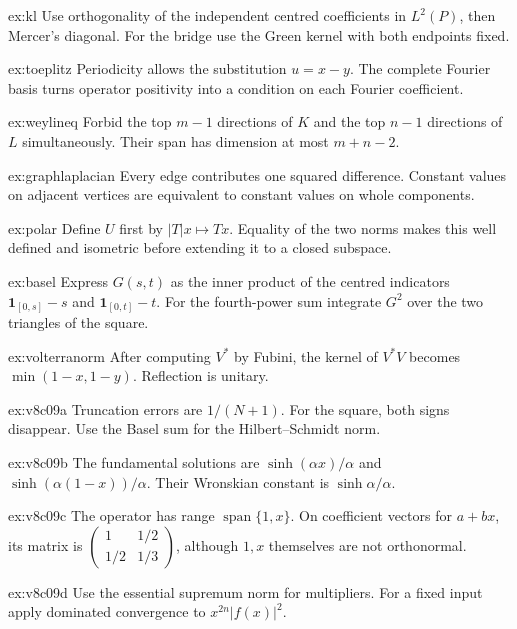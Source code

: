 \begin{hint}{ex:kl}
Use orthogonality of the independent centred coefficients in $L^2(P)$, then Mercer's diagonal. For the bridge use the Green kernel with both endpoints fixed.
\end{hint}
\begin{hint}{ex:toeplitz}
Periodicity allows the substitution $u=x-y$. The complete Fourier basis turns operator positivity into a condition on each Fourier coefficient.
\end{hint}
\begin{hint}{ex:weylineq}
Forbid the top $m-1$ directions of $K$ and the top $n-1$ directions of $L$ simultaneously. Their span has dimension at most $m+n-2$.
\end{hint}
\begin{hint}{ex:graphlaplacian}
Every edge contributes one squared difference. Constant values on adjacent vertices are equivalent to constant values on whole components.
\end{hint}
\begin{hint}{ex:polar}
Define $U$ first by $|T|x\mapsto Tx$. Equality of the two norms makes this well defined and isometric before extending it to a closed subspace.
\end{hint}
\begin{hint}{ex:basel}
Express $G(s,t)$ as the inner product of the centred indicators $\mathbf1_{[0,s]}-s$ and $\mathbf1_{[0,t]}-t$. For the fourth-power sum integrate $G^2$ over the two triangles of the square.
\end{hint}
\begin{hint}{ex:volterranorm}
After computing $V^*$ by Fubini, the kernel of $V^*V$ becomes $\min(1-x,1-y)$. Reflection is unitary.
\end{hint}
\begin{hint}{ex:v8c09a}
Truncation errors are $1/(N+1)$. For the square, both signs disappear. Use the Basel sum for the Hilbert--Schmidt norm.
\end{hint}
\begin{hint}{ex:v8c09b}
The fundamental solutions are $\sinh(\alpha x)/\alpha$ and $\sinh(\alpha(1-x))/\alpha$. Their Wronskian constant is $\sinh\alpha/\alpha$.
\end{hint}
\begin{hint}{ex:v8c09c}
The operator has range $\operatorname{span}\{1,x\}$. On coefficient vectors for $a+bx$, its matrix is $\begin{pmatrix}1&1/2\\1/2&1/3\end{pmatrix}$, although $1,x$ themselves are not orthonormal.
\end{hint}
\begin{hint}{ex:v8c09d}
Use the essential supremum norm for multipliers. For a fixed input apply dominated convergence to $x^{2n}|f(x)|^2$.
\end{hint}

